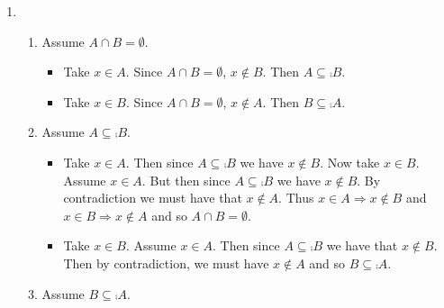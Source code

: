 \documentclass[12pt]{book}
\begin{document}
{\begin{enumerate}
\begin{enumerate}
\begin{itemize}
		\item Take $x \in A$. Then $x \in A \cup B = B$. Since $x \in A$ and $x \in B$ then $x \in A \cap B$ and so $A \subseteq A \cap B$. But since $A \cap B \subseteq A$ we have $A \cap B = A$.
		\end{itemize}
		\item Assume $A \cap B = A$.
		\begin{itemize}
		\item Take $x \in A$. Then $x \in A \cap B$ and so $x \in B$. Therefore $A \subseteq B$.
		\item Take $x \notin B$. Then $x \notin A \cap B$ and so $x \notin A$. Therefore $\comp{A} \supseteq \comp{B}$.
		\item Take $x \in A \cup B$. Then $x \in A$ or $x \in B$. Assume $x \notin B$. Then $x \notin A \cap B = A$ and so $x \notin A \cup B$. By contradiction, we must have the $x \in B$. Then $A \cup B \subseteq B$. But since $B \subseteq A \cup B$ we have that $A \cup B = B$.
		\end{itemize}
		\end{enumerate}
\item \begin{enumerate}
		\item Assume $A \cap B = \emptyset$.
		\begin{itemize}
			\item Take $x \in A$. Since $A \cap B = \emptyset$, $x \notin B$. Then $A \subseteq \comp{B}$.
			\item Take $x \in B$. Since $A \cap B = \emptyset$, $x \notin A$. Then $B \subseteq \comp{A}$.
		\end{itemize}
		\item Assume $A \subseteq \comp{B}$.
		\begin{itemize}
			\item Take $x \in A$. Then since $A \subseteq \comp{B}$ we have $x \notin B$. Now take $x \in B$. Assume $x \in A$. But then since $A \subseteq \comp{B}$ we have $x \notin B$. By contradiction we must have that $x \notin A$. Thus $x \in A \Rightarrow x \notin B$ and $x \in B \Rightarrow x \notin A$ and so $A \cap B = \emptyset$.
			\item Take $x \in B$. Assume $x \in A$. Then since $A \subseteq \comp{B}$ we have that $x \notin B$. Then by contradiction, we must have $x \notin A$ and so $B \subseteq \comp{A}$.
		\end{itemize}
		\item Assume $B \subseteq \comp{A}$.
		\begin{itemize}

\end{itemize}
\end{enumerate}
\end{enumerate}}
\end{document}
